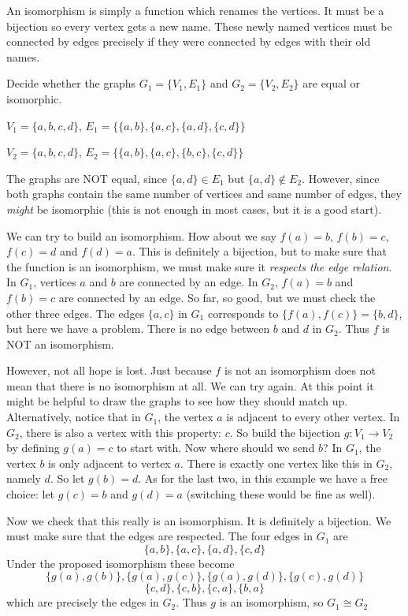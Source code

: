 \documentclass[12pt]{article}
\begin{document}
An isomorphism is simply a function which renames the vertices.  It must be a bijection so every vertex gets a new name.  These newly named vertices must be connected by edges precisely if they were connected by edges with their old names.

\begin{example}
Decide whether the graphs $G_1 = \{V_1, E_1\}$ and $G_2 = \{V_2, E_2\}$ are equal or isomorphic.

$V_1 = \{a,b,c,d\}$, $E_1 = \{\{a,b\}, \{a,c\}, \{a,d\}, \{c,d\}\}$

$V_2 = \{a,b,c,d\}$, $E_2 = \{\{a,b\}, \{a,c\}, \{b,c\}, \{c,d\}\}$

\begin{solution}
The graphs are NOT equal, since $\{a,d\} \in E_1$ but $\{a,d\} \notin E_2$.  However, since both graphs contain the same number of vertices and same number of edges, they \emph{might} be isomorphic (this is not enough in most cases, but it is a good start).  

We can try to build an isomorphism.  How about we say $f(a) = b$, $f(b) = c$, $f(c) = d$ and $f(d) = a$.  This is definitely a bijection, but to make sure that the function is an isomorphism, we must make sure it \emph{respects the edge relation}.  In $G_1$, vertices $a$ and $b$ are connected by an edge.  In $G_2$, $f(a) = b$ and $f(b) = c$ are connected by an edge.  So far, so good, but we must check the other three edges.  The edges $\{a,c\}$ in $G_1$ corresponds to $\{f(a), f(c)\} = \{b,d\}$, but here we have a problem.  There is no edge between $b$ and $d$ in $G_2$.  Thus $f$ is NOT an isomorphism.

However, not all hope is lost.  Just because $f$ is not an isomorphism does not mean that there is no isomorphism at all.  We can try again.  At this point it might be helpful to draw the graphs to see how they should match up.  Alternatively, notice that in $G_1$, the vertex $a$ is adjacent to every other vertex.  In $G_2$, there is also a vertex with this property: $c$.  So build the bijection $g:V_1 \to V_2$ by defining $g(a) = c$ to start with.  Now where should we send $b$?  In $G_1$, the vertex $b$ is only adjacent to vertex $a$.  There is exactly one vertex like this in $G_2$, namely $d$.  So let $g(b) = d$.  As for the last two, in this example we have a free choice: let $g(c) = b$ and $g(d) = a$ (switching these would be fine as well).   

Now we check that this really is an isomorphism.  It is definitely a bijection.  We must make sure that the edges are respected.  The four edges in $G_1$ are
\[\{a,b\}, \{a,c\}, \{a,d\}, \{c,d\}\]
Under the proposed isomorphism these become
\[\{g(a), g(b)\}, \{g(a), g(c)\}, \{g(a), g(d)\}, \{g(c), g(d)\}\]
\[ \{c,d\}, \{c,b\}, \{c,a\}, \{b,a\}\]
which are precisely the edges in $G_2$.  Thus $g$ is an isomorphism, so $G_1 \cong G_2$

\end{solution}
\end{example}
\end{document}
